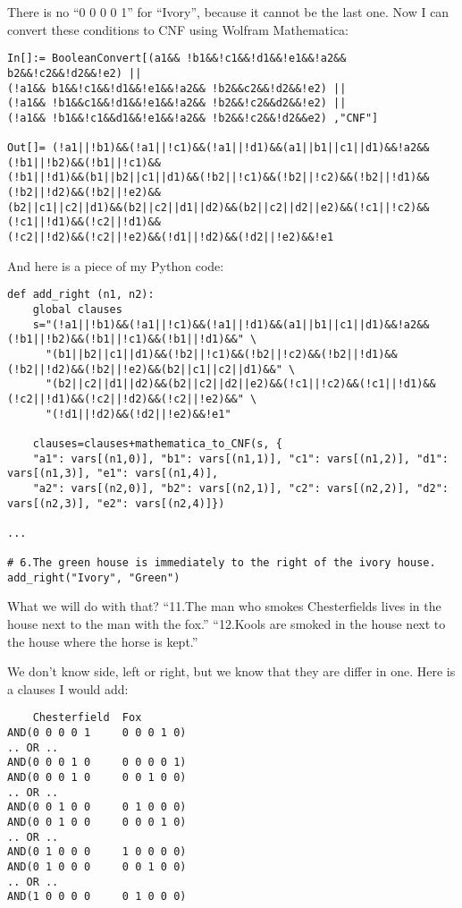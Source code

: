 There is no ``0 0 0 0 1'' for ``Ivory'', because it cannot be the last one.
Now I can convert these conditions to CNF using Wolfram Mathematica:

\begin{lstlisting}
In[]:= BooleanConvert[(a1&& !b1&&!c1&&!d1&&!e1&&!a2&& b2&&!c2&&!d2&&!e2) ||
(!a1&& b1&&!c1&&!d1&&!e1&&!a2&& !b2&&c2&&!d2&&!e2) ||
(!a1&& !b1&&c1&&!d1&&!e1&&!a2&& !b2&&!c2&&d2&&!e2) ||
(!a1&& !b1&&!c1&&d1&&!e1&&!a2&& !b2&&!c2&&!d2&&e2) ,"CNF"]

Out[]= (!a1||!b1)&&(!a1||!c1)&&(!a1||!d1)&&(a1||b1||c1||d1)&&!a2&&(!b1||!b2)&&(!b1||!c1)&&
(!b1||!d1)&&(b1||b2||c1||d1)&&(!b2||!c1)&&(!b2||!c2)&&(!b2||!d1)&&(!b2||!d2)&&(!b2||!e2)&&
(b2||c1||c2||d1)&&(b2||c2||d1||d2)&&(b2||c2||d2||e2)&&(!c1||!c2)&&(!c1||!d1)&&(!c2||!d1)&&
(!c2||!d2)&&(!c2||!e2)&&(!d1||!d2)&&(!d2||!e2)&&!e1
\end{lstlisting}

And here is a piece of my Python code:

\begin{lstlisting}
def add_right (n1, n2):
    global clauses
    s="(!a1||!b1)&&(!a1||!c1)&&(!a1||!d1)&&(a1||b1||c1||d1)&&!a2&&(!b1||!b2)&&(!b1||!c1)&&(!b1||!d1)&&" \
      "(b1||b2||c1||d1)&&(!b2||!c1)&&(!b2||!c2)&&(!b2||!d1)&&(!b2||!d2)&&(!b2||!e2)&&(b2||c1||c2||d1)&&" \
      "(b2||c2||d1||d2)&&(b2||c2||d2||e2)&&(!c1||!c2)&&(!c1||!d1)&&(!c2||!d1)&&(!c2||!d2)&&(!c2||!e2)&&" \
      "(!d1||!d2)&&(!d2||!e2)&&!e1"

    clauses=clauses+mathematica_to_CNF(s, {
	"a1": vars[(n1,0)], "b1": vars[(n1,1)], "c1": vars[(n1,2)], "d1": vars[(n1,3)], "e1": vars[(n1,4)],
	"a2": vars[(n2,0)], "b2": vars[(n2,1)], "c2": vars[(n2,2)], "d2": vars[(n2,3)], "e2": vars[(n2,4)]})

...

# 6.The green house is immediately to the right of the ivory house.
add_right("Ivory", "Green")
\end{lstlisting}

What we will do with that?
``11.The man who smokes Chesterfields lives in the house next to the man with the fox.''
``12.Kools are smoked in the house next to the house where the horse is kept.''

We don't know side, left or right, but we know that they are differ in one.
Here is a clauses I would add:

\begin{lstlisting}
    Chesterfield  Fox
AND(0 0 0 0 1     0 0 0 1 0)
.. OR ..
AND(0 0 0 1 0     0 0 0 0 1)
AND(0 0 0 1 0     0 0 1 0 0)
.. OR ..
AND(0 0 1 0 0     0 1 0 0 0)
AND(0 0 1 0 0     0 0 0 1 0)
.. OR ..
AND(0 1 0 0 0     1 0 0 0 0)
AND(0 1 0 0 0     0 0 1 0 0)
.. OR ..
AND(1 0 0 0 0     0 1 0 0 0)
\end{lstlisting}

